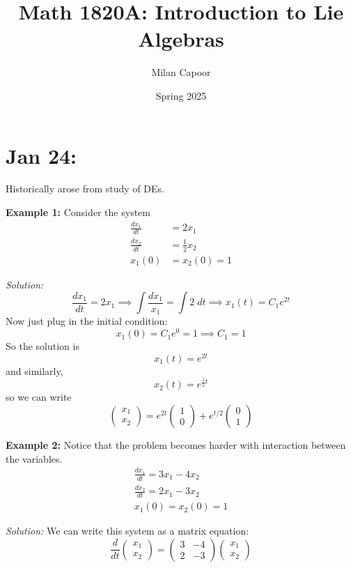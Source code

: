 \documentclass[12pt]{article}
\title{Math 1820A: Introduction to Lie Algebras}
\author{Milan Capoor}
\date{Spring 2025}
\begin{document}
\maketitle
\section{Jan 24:}
    Historically arose from study of DEs.

    \textbf{Example 1:} Consider the system 
    \begin{align*}
        \frac{dx_1}{dt} &= 2x_1\\ 
        \frac{dx_2}{dt} &= \frac{1}{2}x_2\\
        x_1(0) &= x_2(0) = 1
    \end{align*}

    \emph{Solution:}
    \[\frac{dx_1}{dt} = 2x_1 \implies \int \frac{dx_1}{x_1} = \int 2 \; dt \implies x_1(t) = C_1e^{2t}\]
    Now just plug in the initial condition: 
    \[x_1(0) = C_1e^0 = 1 \implies C_1 = 1\]
    So the solution is
    \[x_1(t) = e^{2t}\]
    and similarly, 
    \[x_2(t) = e^{\frac{1}{2}t}\]
    so we can write 
    \[\begin{pmatrix}
        x_1\\ x_2
    \end{pmatrix} = e^{2t} \begin{pmatrix}
        1\\0
    \end{pmatrix} + e^{t/2} \begin{pmatrix}
        0\\1
    \end{pmatrix}\]

    \textbf{Example 2:} Notice that the problem becomes harder with interaction between the variables. 
    \begin{align*}
        \frac{dx_1}{dt} = 3x_1 - 4x_2\\ 
        \frac{dx_2}{dt} = 2x_1 - 3x_2\\
        x_1(0) = x_2(0) = 1
    \end{align*}

    \emph{Solution:} We can write this system as a matrix equation:
    \[\frac{d}{dt} \begin{pmatrix}
        x_1\\x_2
    \end{pmatrix} = \begin{pmatrix}
        3 & -4\\
        2 & -3
    \end{pmatrix} \begin{pmatrix}
        x_1\\x_2
    \end{pmatrix}\]
\end{document}
